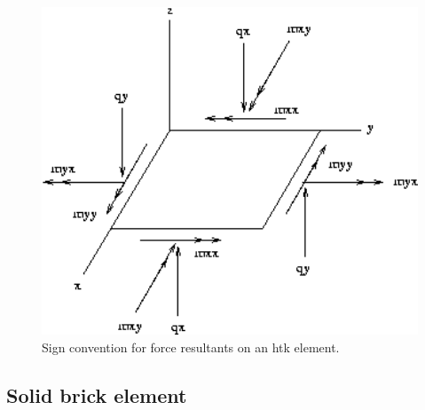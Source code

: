 \begin{figure}
 \begin{center}
  \includegraphics[width=5in]{figures/htk}
 \end{center}
 \caption{Sign convention for force resultants on an htk element.}
 \label{elements.htk_fig}
\end{figure} 

\subsection{Solid brick element}
\label{elements.brick}

